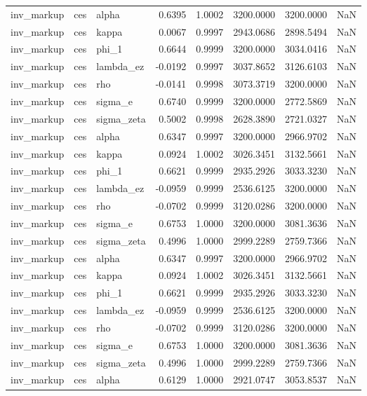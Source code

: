 \begin{tabular}{lllrrrrl}
inv\_markup & ces & alpha & 0.6395 & 1.0002 & 3200.0000 & 3200.0000 & NaN \\
inv\_markup & ces & kappa & 0.0067 & 0.9997 & 2943.0686 & 2898.5494 & NaN \\
inv\_markup & ces & phi\_1 & 0.6644 & 0.9999 & 3200.0000 & 3034.0416 & NaN \\
inv\_markup & ces & lambda\_ez & -0.0192 & 0.9997 & 3037.8652 & 3126.6103 & NaN \\
inv\_markup & ces & rho & -0.0141 & 0.9998 & 3073.3719 & 3200.0000 & NaN \\
inv\_markup & ces & sigma\_e & 0.6740 & 0.9999 & 3200.0000 & 2772.5869 & NaN \\
inv\_markup & ces & sigma\_zeta & 0.5002 & 0.9998 & 2628.3890 & 2721.0327 & NaN \\
inv\_markup & ces & alpha & 0.6347 & 0.9997 & 3200.0000 & 2966.9702 & NaN \\
inv\_markup & ces & kappa & 0.0924 & 1.0002 & 3026.3451 & 3132.5661 & NaN \\
inv\_markup & ces & phi\_1 & 0.6621 & 0.9999 & 2935.2926 & 3033.3230 & NaN \\
inv\_markup & ces & lambda\_ez & -0.0959 & 0.9999 & 2536.6125 & 3200.0000 & NaN \\
inv\_markup & ces & rho & -0.0702 & 0.9999 & 3120.0286 & 3200.0000 & NaN \\
inv\_markup & ces & sigma\_e & 0.6753 & 1.0000 & 3200.0000 & 3081.3636 & NaN \\
inv\_markup & ces & sigma\_zeta & 0.4996 & 1.0000 & 2999.2289 & 2759.7366 & NaN \\
inv\_markup & ces & alpha & 0.6347 & 0.9997 & 3200.0000 & 2966.9702 & NaN \\
inv\_markup & ces & kappa & 0.0924 & 1.0002 & 3026.3451 & 3132.5661 & NaN \\
inv\_markup & ces & phi\_1 & 0.6621 & 0.9999 & 2935.2926 & 3033.3230 & NaN \\
inv\_markup & ces & lambda\_ez & -0.0959 & 0.9999 & 2536.6125 & 3200.0000 & NaN \\
inv\_markup & ces & rho & -0.0702 & 0.9999 & 3120.0286 & 3200.0000 & NaN \\
inv\_markup & ces & sigma\_e & 0.6753 & 1.0000 & 3200.0000 & 3081.3636 & NaN \\
inv\_markup & ces & sigma\_zeta & 0.4996 & 1.0000 & 2999.2289 & 2759.7366 & NaN \\
inv\_markup & ces & alpha & 0.6129 & 1.0000 & 2921.0747 & 3053.8537 & NaN \\

\end{tabular}
